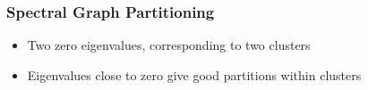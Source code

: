 \documentclass[9pt]{beamer}
\begin{document}
\begin{frame}
\frametitle{Spectral Graph Partitioning}
\label{sec-2-5}

\vspace*{-0.0cm}\begin{figure}
\end{figure}
\vspace*{-0.0cm}\begin{figure}
\end{figure}
\begin{itemize}
\item Two zero eigenvalues, corresponding to two clusters
\item Eigenvalues close to zero give good partitions within clusters
\end{itemize}
\end{frame}
\end{document}
